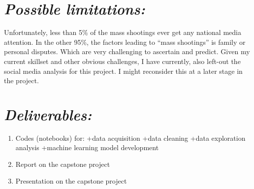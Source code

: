 \documentclass[]{article}
\providecommand{\tightlist}{%
  \setlength{\itemsep}{0pt}\setlength{\parskip}{0pt}}
\begin{document}
\section{\texorpdfstring{\emph{Possible
limitations:}}{Possible limitations:}}\label{possible-limitations}

Unfortunately, less than 5\% of the mass shootings ever get any national
media attention. In the other 95\%, the factors leading to ``mass
shootings'' is family or personal disputes. Which are very challenging
to ascertain and predict. Given my current skillset and other obvious
challenges, I have currently, also left-out the social media analysis
for this project. I might reconsider this at a later stage in the
project.

\section{\texorpdfstring{\emph{Deliverables:}}{Deliverables:}}\label{deliverables}

\begin{enumerate}
\def\labelenumi{\arabic{enumi}.}
\tightlist
\item
  Codes (notebooks) for: +data acquisition +data cleaning +data
  exploration analysis +machine learning model development
\item
  Report on the capstone project
\item
  Presentation on the capstone project
\end{enumerate}
\end{document}

